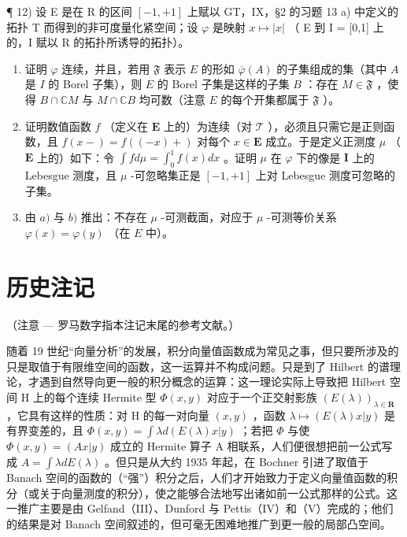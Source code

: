 ¶ 12) 设 E 是在 R 的区间 \([-1,+1]\) 上赋以 GT，IX，§2 的习题 13 a) 中定义的拓扑 T 而得到的非可度量化紧空间；设 \(\varphi\) 是映射 \(x \mapsto |x|\) （ E 到 I = {[}0,1{]} 上的，I 赋以 R 的拓扑所诱导的拓扑）。

\begin{enumerate}
\def\labelenumi{\alph{enumi})}
\item
  证明 \(\varphi\) 连续，并且，若用 \(\mathfrak{F}\) 表示 \(E\) 的形如 \(\overline{\varphi}(A)\) 的子集组成的集（其中 \(A\) 是 \(I\) 的 Borel 子集），则 \(E\) 的 Borel 子集是这样的子集 \(B\) ：存在 \(M \in \mathfrak{F}\) ，使得 \(B \cap \mathbb{C}M\) 与 \(M \cap \mathbb{C}B\) 均可数（注意 \(E\) 的每个开集都属于 \(\mathfrak{F}\) ）。
\item
  证明数值函数 \(f\) （定义在 \(\mathbf{E}\) 上的）为连续（对 \(\mathcal{T}\) ），必须且只需它是正则函数，且 \(f(x-) = f((-x)+)\) 对每个 \(x \in \mathbf{E}\) 成立。于是定义正测度 \(\mu\) （ \(\mathbf{E}\) 上的）如下：令 \(\int f d\mu = \int_0^1 f(x) dx\) 。证明 \(\mu\) 在 \(\varphi\) 下的像是 \(\mathbf{I}\) 上的 Lebesgue 测度，且 \(\mu\) -可忽略集正是 \([-1, +1]\) 上对 Lebesgue 测度可忽略的子集。
\item
  由 \(a)\) 与 \(b)\) 推出：不存在 \(\mu\) -可测截面，对应于 \(\mu\) -可测等价关系 \(\varphi(x) = \varphi(y)\) （在 \(E\) 中）。
\end{enumerate}

\chapter*{历史注记}
{}

（注意 --- 罗马数字指本注记末尾的参考文献。）

随着 19 世纪“向量分析”的发展，积分向量值函数成为常见之事，但只要所涉及的只是取值于有限维空间的函数，这一运算并不构成问题。只是到了 Hilbert 的谱理论，才遇到自然导向更一般的积分概念的运算：这一理论实际上导致把 Hilbert 空间 H 上的每个连续 Hermite 型 \(\Phi(x,y)\) 对应于一个正交射影族 \((E(\lambda))_{\lambda\in\mathbf{R}}\) ，它具有这样的性质：对 H 的每一对向量 \((x,y)\) ，函数 \(\lambda\mapsto(E(\lambda)x|y)\) 是有界变差的，且 \(\Phi(x,y)=\int\lambda d(E(\lambda)x|y)\) ；若把 \(\Phi\) 与使 \(\Phi(x,y)=(Ax|y)\) 成立的 Hermite 算子 A 相联系，人们便很想把前一公式写成 \(A=\int\lambda dE(\lambda)\) 。但只是从大约 1935 年起，在 Bochner 引进了取值于 Banach 空间的函数的（“强”）积分之后，人们才开始致力于定义向量值函数的积分（或关于向量测度的积分），使之能够合法地写出诸如前一公式那样的公式。这一推广主要是由 Gelfand（III）、Dunford 与 Pettis（IV）和（V）完成的；他们的结果是对 Banach 空间叙述的，但可毫无困难地推广到更一般的局部凸空间。

